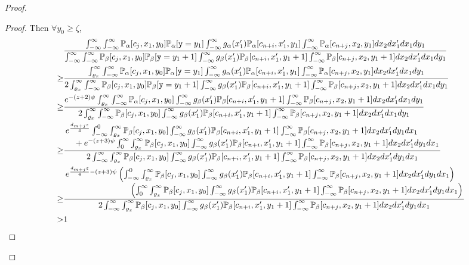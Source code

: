 \begin{proof}
\begin{proof}
		Then $\forall y_0\geq \zeta$, \begin{align*}
			&\frac{\int_{-\infty}^\infty\int_{-\infty}^{\infty}\PP_\alpha[c_{j}, x_1, y_0]\PP_\alpha[\texttt{y}=y_1]\int_{-\infty}^\infty g_\alpha(x_1')\PP_\alpha[c_{n+i}, x_1', y_1]\int_{-\infty}^\infty \PP_\alpha[c_{n+j}, x_2, y_1]dx_2 dx_1' dx_1dy_1}{\int_{-\infty}^\infty\int_{-\infty}^{\infty}\PP_\beta[c_{j}, x_1, y_0]\PP_\beta[\texttt{y}=y_1+1]\int_{-\infty}^\infty g_\beta(x_1')\PP_\beta[c_{n+i}, x_1', y_1+1]\int_{-\infty}^\infty \PP_\beta[c_{n+j}, x_2, y_1+1]dx_2 dx_1' dx_1dy_1}\\
			\geq &\frac{\int_{\varrho_x}^\infty\int_{-\infty}^{\infty}\PP_\alpha[c_{j}, x_1, y_0]\PP_\alpha[\texttt{y}=y_1]\int_{-\infty}^\infty g_\alpha(x_1')\PP_\alpha[c_{n+i}, x_1', y_1]\int_{-\infty}^\infty \PP_\alpha[c_{n+j}, x_2, y_1]dx_2 dx_1' dx_1dy_1}
			{2\int_{\varrho_x}^\infty\int_{-\infty}^{\infty}\PP_\beta[c_{j}, x_1, y_0]\PP_\beta[\texttt{y}=y_1+1]\int_{-\infty}^\infty g_\beta(x_1')\PP_\beta[c_{n+i}, x_1', y_1+1]\int_{-\infty}^\infty \PP_\beta[c_{n+j}, x_2, y_1+1]dx_2 dx_1' dx_1dy_1}\\
			\geq &\frac{e^{-(z+2)\psi}\int_{\varrho_x}^\infty\int_{-\infty}^{\infty}\PP_\alpha[c_{j}, x_1, y_0]\int_{-\infty}^\infty g_\beta(x_1')\PP_\beta[c_{n+i}, x_1', y_1+1]\int_{-\infty}^\infty \PP_\beta[c_{n+j}, x_2, y_1+1]dx_2 dx_1' dx_1dy_1}
			{2\int_{\varrho_x}^\infty\int_{-\infty}^{\infty}\PP_\beta[c_{j}, x_1, y_0]\int_{-\infty}^\infty g_\beta(x_1')\PP_\beta[c_{n+i}, x_1', y_1+1]\int_{-\infty}^\infty \PP_\beta[c_{n+j}, x_2, y_1+1]dx_2 dx_1' dx_1dy_1}\\
			\geq &\frac{\splitfrac{e^{\frac{d_{m+j}\varepsilon}{4}}\int_{-\infty}^{0}\int_{\varrho_x}^\infty\PP_\beta[c_{j}, x_1, y_0]\int_{-\infty}^\infty g_\beta(x_1')\PP_\beta[c_{n+i}, x_1', y_1+1]\int_{-\infty}^\infty \PP_\beta[c_{n+j}, x_2, y_1+1]dx_2 dx_1' dy_1dx_1}
			{+e^{-(z+3)\psi}\int_{0}^{\infty}\int_{\varrho_x}^\infty\PP_\beta[c_{j}, x_1, y_0]\int_{-\infty}^\infty g_\beta(x_1')\PP_\beta[c_{n+i}, x_1', y_1+1]\int_{-\infty}^\infty \PP_\beta[c_{n+j}, x_2, y_1+1]dx_2 dx_1' dy_1dx_1}}
			{2\int_{-\infty}^{\infty}\int_{\varrho_x}^\infty\PP_\beta[c_{j}, x_1, y_0]\int_{-\infty}^\infty g_\beta(x_1')\PP_\beta[c_{n+i}, x_1', y_1+1]\int_{-\infty}^\infty \PP_\beta[c_{n+j}, x_2, y_1+1]dx_2 dx_1'dy_1 dx_1}\\
			\geq &\frac{\splitfrac{e^{\frac{d_{m+j}\varepsilon}{4}-(z+3)\psi}\left(\int_{-\infty}^{0}\int_{\varrho_x}^\infty\PP_\beta[c_{j}, x_1, y_0]\int_{-\infty}^\infty g_\beta(x_1')\PP_\beta[c_{n+i}, x_1', y_1+1]\int_{-\infty}^\infty \PP_\beta[c_{n+j}, x_2, y_1+1]dx_2 dx_1' dy_1dx_1\right)}
			{\left(\int_{0}^{\infty}\int_{\varrho_x}^\infty\PP_\beta[c_{j}, x_1, y_0]\int_{-\infty}^\infty g_\beta(x_1')\PP_\beta[c_{n+i}, x_1', y_1+1]\int_{-\infty}^\infty \PP_\beta[c_{n+j}, x_2, y_1+1]dx_2 dx_1' dy_1dx_1\right)}}
			{2\int_{-\infty}^{\infty}\int_{\varrho_x}^\infty\PP_\beta[c_{j}, x_1, y_0]\int_{-\infty}^\infty g_\beta(x_1')\PP_\beta[c_{n+i}, x_1', y_1+1]\int_{-\infty}^\infty \PP_\beta[c_{n+j}, x_2, y_1+1]dx_2 dx_1'dy_1 dx_1}\\
			>&1
		\end{align*}
		

\end{proof}
\end{proof}
